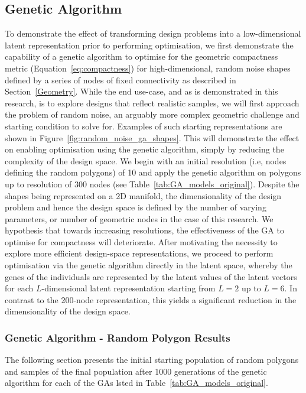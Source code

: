 \documentclass{article}
\begin{document}
\subsection{Genetic Algorithm}
To demonstrate the effect of transforming design problems into a low-dimensional latent representation prior to performing optimisation, we first demonstrate the capability of a genetic algorithm to optimise for the geometric compactness metric (Equation~\eqref{eq:compactness}) for high-dimensional, random noise shapes defined by a series of nodes of fixed connectivity as described in Section~\ref{Geometry}. While the end use-case, and as is demonstrated in this research, is to explore designs that reflect realistic samples, we will first approach the problem of random noise, an arguably more complex geometric challenge and starting condition to solve for. Examples of such starting representations are shown in Figure~\ref{fig:random_noise_ga_shapes}. This will demonstrate the effect on enabling optimisation using the genetic algorithm, simply by reducing the complexity of the design space. We begin with an initial resolution (i.e, nodes defining the random polygons) of 10 and apply the genetic algorithm on polygons up to resolution of 300 nodes (see Table~\ref{tab:GA_models_original}). Despite the shapes being represented on a 2D manifold, the dimensionality of the design problem and hence the design space is defined by the number of varying parameters, or number of geometric nodes in the case of this research. We hypothesis that towards increasing resolutions, the effectiveness of the GA to optimise for compactness will deteriorate. After motivating the necessity to explore more efficient design-space representations, we proceed to perform optimisation via the genetic algorithm directly in the latent space, whereby the genes of the individuals are represented by the latent values of the latent vectors for each $L$-dimensional latent representation starting from $L=2$ up to $L=6$. In contrast to the 200-node representation, this yields a significant reduction in the dimensionality of the design space.

\subsubsection{Genetic Algorithm - Random Polygon Results}\label{random_polygon_ga}
The following section presents the initial starting population of random polygons and samples of the final population after 1000 generations of the genetic algorithm for each of the GAs lsted in Table~\ref{tab:GA_models_original}.
\end{document}
